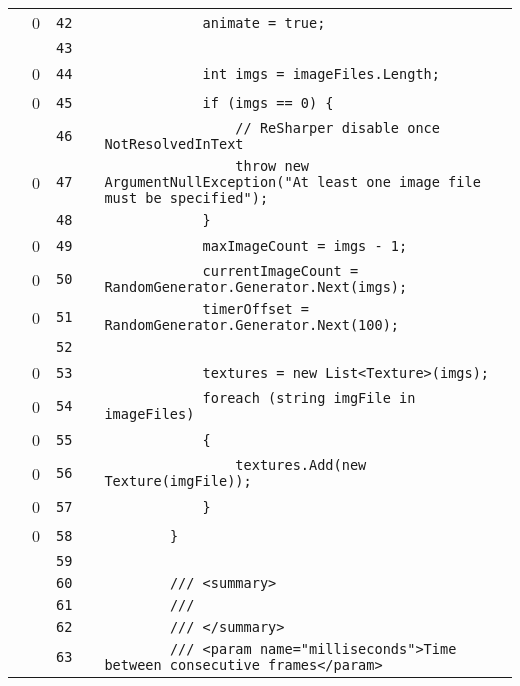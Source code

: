 \documentclass[a4paper,landscape,10pt]{article}
\begin{document}
\begin{longtable}[l]{lrrll}
\cellcolor{red} & 0 & \verb~42~ & & \verb~            animate = true;~\\
\cellcolor{gray} &  & \verb~43~ & & \verb~~\\
\cellcolor{red} & 0 & \verb~44~ & & \verb~            int imgs = imageFiles.Length;~\\
\cellcolor{red} & 0 & \verb~45~ & & \verb~            if (imgs == 0) {~\\
\cellcolor{gray} &  & \verb~46~ & & \verb~                // ReSharper disable once NotResolvedInText~\\
\cellcolor{red} & 0 & \verb~47~ & & \verb~                throw new ArgumentNullException("At least one image file must be specified");~\\
\cellcolor{gray} &  & \verb~48~ & & \verb~            }~\\
\cellcolor{red} & 0 & \verb~49~ & & \verb~            maxImageCount = imgs - 1;~\\
\cellcolor{red} & 0 & \verb~50~ & & \verb~            currentImageCount = RandomGenerator.Generator.Next(imgs);~\\
\cellcolor{red} & 0 & \verb~51~ & & \verb~            timerOffset = RandomGenerator.Generator.Next(100);~\\
\cellcolor{gray} &  & \verb~52~ & & \verb~~\\
\cellcolor{red} & 0 & \verb~53~ & & \verb~            textures = new List<Texture>(imgs);~\\
\cellcolor{red} & 0 & \verb~54~ & & \verb~            foreach (string imgFile in imageFiles)~\\
\cellcolor{red} & 0 & \verb~55~ & & \verb~            {~\\
\cellcolor{red} & 0 & \verb~56~ & & \verb~                textures.Add(new Texture(imgFile));~\\
\cellcolor{red} & 0 & \verb~57~ & & \verb~            }~\\
\cellcolor{red} & 0 & \verb~58~ & & \verb~        }~\\
\cellcolor{gray} &  & \verb~59~ & & \verb~~\\
\cellcolor{gray} &  & \verb~60~ & & \verb~        /// <summary>~\\
\cellcolor{gray} &  & \verb~61~ & & \verb~        ///~\\
\cellcolor{gray} &  & \verb~62~ & & \verb~        /// </summary>~\\
\cellcolor{gray} &  & \verb~63~ & & \verb~        /// <param name="milliseconds">Time between consecutive frames</param>~\\

\end{longtable}
\end{document}
